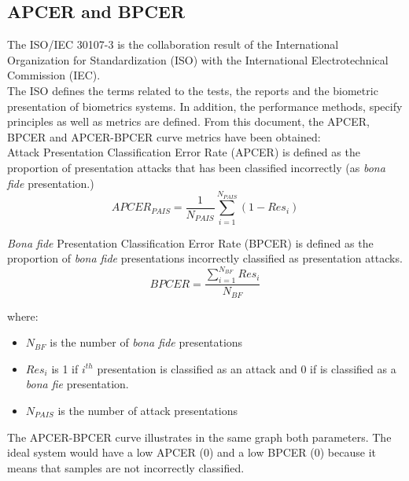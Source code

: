 \subsection{APCER and BPCER}
The ISO/IEC 30107-3 \cite{ISO} is the collaboration result of  the International Organization for Standardization (ISO) with the International Electrotechnical Commission (IEC).\\

The ISO defines the terms related to the tests, the reports and the biometric presentation of biometrics systems. In addition, the performance methods, specify principles as well as metrics are defined. From this document, the APCER, BPCER and APCER-BPCER curve metrics have been obtained:\\

Attack Presentation Classification Error Rate (APCER) is defined as the proportion of presentation attacks that has been classified incorrectly (as \textit{bona fide} presentation.)\\

\begin{equation}
  APCER_{PAIS} = \frac{1}{N_{PAIS}}\sum_{i=1}^{N_{PAIS}}(1 - Res_{i})
\end{equation}

\textit{Bona fide} Presentation Classification Error Rate (BPCER) is defined as the proportion of \textit{bona fide} presentations  incorrectly classified as presentation attacks.\\

\begin{equation}
  BPCER = \frac{\sum_{i=1}^{N_{BF}}Res_{i}}{N_{BF}}
\end{equation}

where: \begin{itemize}
\item $N_{BF}$ is the number of \textit{bona fide} presentations
\item $Res_{i}$ is 1 if $i^{th}$ presentation is classified as an attack and 0 if is classified as a \textit{bona fie} presentation.
\item $N_{PAIS}$ is the number of attack presentations
\end{itemize}

The APCER-BPCER curve illustrates in the same graph both parameters. The ideal system would have a low APCER (0) and a low BPCER (0) because it means that samples are not incorrectly classified.\\
